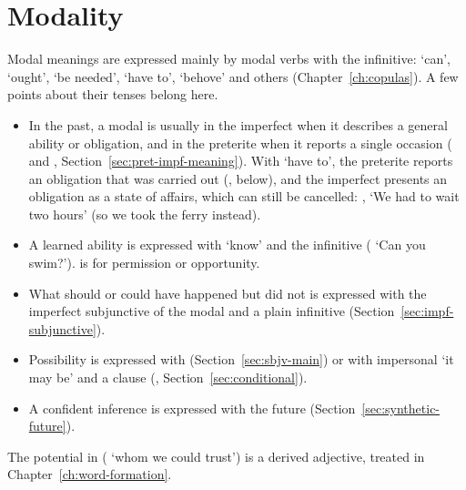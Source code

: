 \section{Modality}\label{sec:tam-modality}
Modal meanings are expressed mainly by modal verbs with the infinitive:  `can',  `ought',  `be needed',  `have to',  `behove' and others (Chapter~\ref{ch:copulas}). A few points about their tenses belong here.
\begin{itemize}
    \item In the past, a modal is usually in the imperfect when it describes a general ability or obligation, and in the preterite when it reports a single occasion ( and , Section~\ref{sec:pret-impf-meaning}). With  `have to', the preterite reports an obligation that was carried out (, below), and the imperfect presents an obligation as a state of affairs, which can still be cancelled: , `We had to wait two hours' (so we took the ferry instead).
    \item A learned ability is expressed with  `know' and the infinitive ( `Can you swim?').  is for permission or opportunity.
    \item What should or could have happened but did not is expressed with the imperfect subjunctive of the modal and a plain infinitive (Section~\ref{sec:impf-subjunctive}).
    \item Possibility is expressed with  (Section~\ref{sec:sbjv-main}) or with impersonal  `it may be' and a clause (, Section~\ref{sec:conditional}).
    \item A confident inference is expressed with the future (Section~\ref{sec:synthetic-future}).
\end{itemize}
The potential in  ( `whom we could trust') is a derived adjective, treated in Chapter~\ref{ch:word-formation}.
